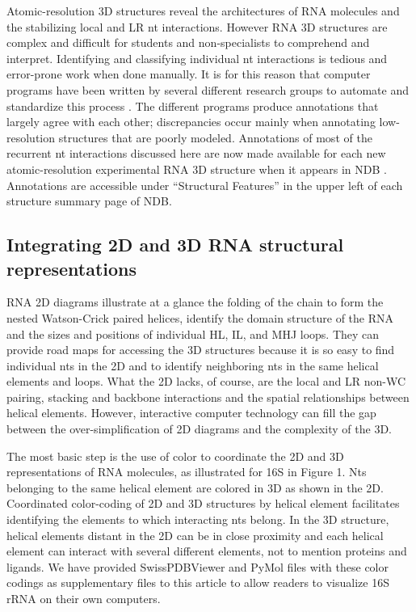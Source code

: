 Atomic-resolution 3D structures reveal the architectures of RNA molecules and
the stabilizing local and LR nt interactions. However RNA 3D structures are
complex and difficult for students and non-specialists to comprehend and
interpret. Identifying and classifying individual nt interactions is tedious and
error-prone work when done manually. It is for this reason that computer
programs have been written by several different research groups to automate and
standardize this process \cite{Petrov2011a, Sarver2008a, Yang2003a,
Gendron2001b, Parisien2008a}. The different programs produce annotations that
largely agree with each other; discrepancies occur mainly when annotating
low-resolution structures that are poorly modeled. Annotations of most of the
recurrent nt interactions discussed here are now made available for each new
atomic-resolution experimental RNA 3D structure when it appears in NDB
\cite{Petrov2013}. Annotations are accessible under ``Structural Features'' in
the upper left of each structure summary page of NDB. 

\subsection{Integrating 2D and 3D RNA structural representations}

RNA 2D diagrams illustrate at a glance the folding of the chain to form the
nested Watson-Crick paired helices, identify the domain structure of the RNA and
the sizes and positions of individual HL, IL, and MHJ loops. They can provide
road maps for accessing the 3D structures because it is so easy to find
individual nts in the 2D and to identify neighboring nts in the same helical
elements and loops. What the 2D lacks, of course, are the local and LR non-WC
pairing, stacking and backbone interactions and the spatial relationships
between helical elements. However, interactive computer technology can fill the
gap between the over-simplification of 2D diagrams and the complexity of the 3D. 

The most basic step is the use of color to coordinate the 2D and 3D
representations of RNA molecules, as illustrated for 16S in Figure 1. Nts
belonging to the same helical element are colored in 3D as shown in the 2D.
Coordinated color-coding of 2D and 3D structures by helical element facilitates
identifying the elements to which interacting nts belong. In the 3D structure,
helical elements distant in the 2D can be in close proximity and each helical
element can interact with several different elements, not to mention proteins
and ligands.  We have provided SwissPDBViewer and PyMol files with these color
codings as supplementary files to this article to allow readers to visualize
\EC{} 16S rRNA on their own computers. 

